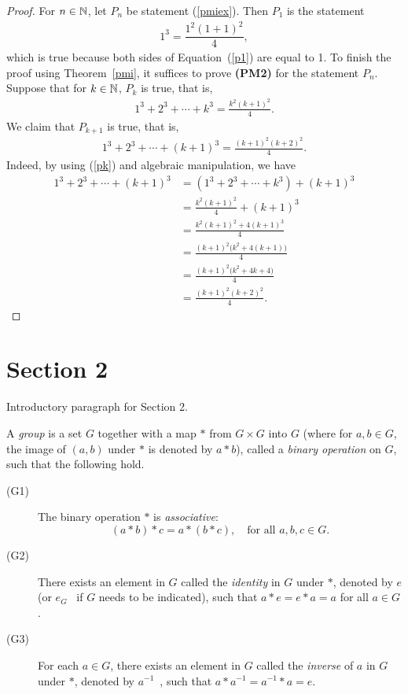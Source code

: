\begin{proof}
	For $n\in\mathbb{N}$, let $P_n$ be statement (\ref{pmiex}). Then $P_1$ is the statement
	\begin{align}\label{p1}
		1^3 = \dfrac{1^2(1+1)^2}{4},    
	\end{align}
	which is true because both sides of Equation~(\ref{p1}) are equal to 1. To finish the proof using Theorem~\ref{pmi}, it suffices to prove \textbf{(PM2)} for the statement $P_n$. Suppose that for $k\in\mathbb{N}$, $P_k$ is true, that is,
	\begin{align}\label{pk}
		1^3 + 2^3 + \cdots + k^3 = \frac{k^2(k+1)^2}{4}.
	\end{align}
	We claim that $P_{k+1}$ is true, that is,
	\begin{align*}
		1^3 + 2^3 + \cdots + (k+1)^3 = \frac{(k+1)^2(k+2)^2}{4}.
	\end{align*}
	Indeed, by using (\ref{pk}) and algebraic manipulation, we have
	\begin{align*}
		1^3 + 2^3 + \cdots + (k+1)^3 &= \left(1^3 + 2^3 + \cdots + k^3\right) + (k+1)^3\\
		&= \frac{k^2(k+1)^2}{4} + (k+1)^3\\
		&= \frac{k^2(k+1)^2+4(k+1)^3}{4}\\
		&= \frac{(k+1)^2\big(k^2+4(k+1)\big)}{4}\\
		&= \frac{(k+1)^2\big(k^2+4k+4\big)}{4}\\
		&= \frac{(k+1)^2(k+2)^2}{4}.
	\end{align*}
\end{proof}

\section{Section 2}

Introductory paragraph for Section 2.

\begin{defn}\label{group}
	A \textit{group} is a set $G$ together with a map $*$ from $G\times G$ into $G$ (where for $a,b\in G$, the image of $(a,b)$ under $*$ is denoted by $a*b$\label{binop}), called a \textit{binary operation} on $G$, such that the following hold.
	\begin{description}
		\item[(G1)] The binary operation $*$ is \textit{associative}:
		\[
		(a*b)*c = a*(b*c),\quad\text{for all } a,b,c\in G.
		\]
		\item[(G2)] There exists an element in $G$ called the \textit{identity} in $G$ under $*$, denoted by $e$ (or $e_G$~\label{ident} if $G$ needs to be indicated), such that
		$a*e=e*a=a$ for all $a\in G$.
		\item[(G3)] For each $a\in G$, there exists an element in $G$ called the \textit{inverse} of $a$ in $G$ under $*$, denoted by $a^{-1}$~\label{inv}, such that $a*a^{-1}=a^{-1}*a=e.$
	\end{description}
\end{defn}

